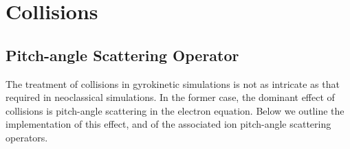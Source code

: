 \chapter{Collisions}\label{chap.collision}

\section{Pitch-angle Scattering Operator}

The treatment of collisions in gyrokinetic simulations is not 
as intricate as that required in neoclassical simulations.
In the former case, the dominant effect of collisions is 
pitch-angle scattering in the electron equation.  Below we 
outline the implementation of this effect, and of the 
associated ion pitch-angle scattering operators.

\newcommand\apn{\delta A_{\parallel,n}}
\newcommand\apndot{\delta \dot{A}_{\parallel,n}}
\newcommand\fn{f_{\si,n}}

